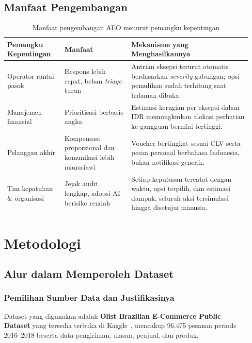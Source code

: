 \documentclass[12pt,a4paper]{article}
\begin{document}
\subsection{Manfaat Pengembangan}

\begin{table}[H]
  \centering\footnotesize
  \caption{Manfaat pengembangan AEO menurut pemangku kepentingan}
  \begin{tabularx}{\textwidth}{L{2.5cm} L{3.1cm} Y}
    \toprule
    \textbf{Pemangku Kepentingan} & \textbf{Manfaat} & \textbf{Mekanisme yang Menghasilkannya} \\
    \midrule
    Operator rantai pasok
      & Respons lebih cepat, beban \textit{triage} turun
      & Antrian eksepsi terurut otomatis berdasarkan \textit{severity} gabungan; opsi pemulihan sudah terhitung saat halaman dibuka. \\[1.5pt]
    Manajemen finansial
      & Prioritisasi berbasis angka
      & Estimasi kerugian per eksepsi dalam IDR memungkinkan alokasi perhatian ke gangguan bernilai tertinggi. \\[1.5pt]
    Pelanggan akhir
      & Kompensasi proporsional dan komunikasi lebih manusiawi
      & Voucher bertingkat sesuai CLV serta pesan personal berbahasa Indonesia, bukan notifikasi generik. \\[1.5pt]
    Tim kepatuhan \& organisasi
      & Jejak audit lengkap, adopsi AI berisiko rendah
      & Setiap keputusan tercatat dengan waktu, opsi terpilih, dan estimasi dampak; seluruh aksi tersimulasi hingga disetujui manusia. \\
    \bottomrule
  \end{tabularx}
\end{table}

\section{Metodologi}

\subsection{Alur dalam Memperoleh Dataset}

\subsubsection{Pemilihan Sumber Data dan Justifikasinya}

Dataset yang digunakan adalah \textbf{Olist Brazilian E-Commerce Public Dataset} yang tersedia terbuka di Kaggle~\cite{olist}, mencakup 96.475 pesanan periode 2016--2018 beserta data pengiriman, ulasan, penjual, dan produk.
\end{document}
